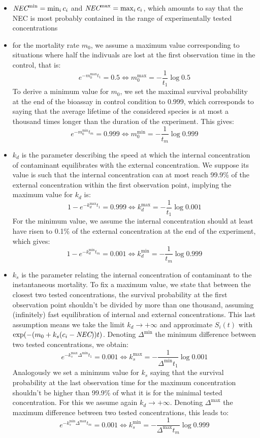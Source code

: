 \documentclass{article}
\begin{document}
\begin{itemize}
\item $\mbox{\it NEC}^{\min} = \min_i c_i$  and $\mbox{\it NEC}^{\max} = \max_i c_i$,
  which amounts to say that the NEC is most probably contained in the
  range of experimentally tested concentrations
\item for the mortality rate $m_0$, we assume a maximum value
  corresponding to situations where half the indivuals are lost at the
  first observation time in the control, that is:
  $$
  e^{- m_0^{\max} t_1} = 0.5 \Leftrightarrow m_0^{\max} = - \frac{1}{t_1} \log 0.5
  $$
  To derive a minimum value for $m_0$, we set the maximal survival
  probability at the end of the bioassay in control condition to
  0.999, which corresponds to saying that the average lifetime of the
  considered species is at most a thousand times longer than the
  duration of the experiment. This gives:
  $$
  e^{- m_0^{\min} t_m} = 0.999 \Leftrightarrow m_0^{\min} = - \frac{1}{t_m} \log 0.999
  $$
\item $k_d$ is the parameter describing the speed at which the
  internal concentration of contaminant equilibrates with the external
  concentration. We suppose its value is such that the internal
  concentration can at most reach 99.9\% of the external concentration
  within the first observation point, implying the maximum value for
  $k_d$ is:
  $$
  1 - e^{- k_d^{\max} t_1} = 0.999 \Leftrightarrow k_d^{\max} = - \frac{1}{t_1} \log 0.001
  $$
  For the minimum value, we assume the internal concentration should
  at least have risen to 0.1\% of the external concentration at the
  end of the experiment, which gives:
  $$
  1 - e^{- k_d^{\min} t_m} = 0.001 \Leftrightarrow k_d^{\min} = - \frac{1}{t_m} \log 0.999
  $$
\item $k_s$ is the parameter relating the internal concentration of
  contaminant to the instantaneous mortality. To fix a maximum value,
  we state that between the closest two tested concentrations, the
  survival probability at the first observation point shouldn't be
  divided by more than one thousand, assuming (infinitely) fast
  equilibration of internal and external concentrations. This last
  assumption means we take the limit $k_d \rightarrow + \infty$ and
  approximate $S_i(t)$ with $\exp(- (m_0 + k_s(c_i -
  \mbox{\it NEC}))t)$. Denoting $\Delta^{\min}$ the minimum difference between two
  tested concentrations, we obtain:
  $$
  e^{- k_s^{\max} \Delta^{\min} t_1} = 0.001 \Leftrightarrow k_s^{\max} = - \frac{1}{\Delta^{\min} t_1} \log 0.001
  $$
  Analogously we set a minimum value for $k_s$ saying that the
  survival probability at the last observation time for the maximum
  concentration shouldn't be higher than 99.9\% of what it is for the
  minimal tested concentration. For this we assume again $k_d
  \rightarrow + \infty$. Denoting $\Delta^{\max}$ the maximum
  difference between two tested concentrations, this leads to:
  $$
  e^{- k_s^{\min} \Delta^{\max} t_m} = 0.001 \Leftrightarrow k_s^{\min} = - \frac{1}{\Delta^{\max} t_m} \log 0.999
  $$
\end{itemize}
\end{document}
